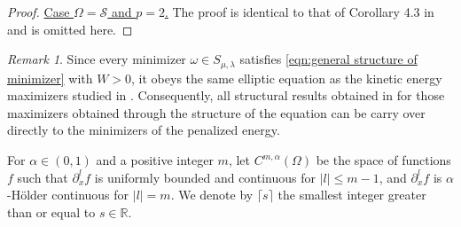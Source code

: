 \documentclass[11pt,letterpaper]{amsart}
\theoremstyle{definition}
\theoremstyle{remark}
\newtheorem{remark}[thm]{Remark}
\renewcommand{\S}{\mathcal{S}}
\renewcommand{\O}{\Omega}
\numberwithin{equation}{section}
\begin{document}
\begin{proof}
    \underline{Case $\Omega=\S$ and $p=2$.} The proof is identical to that of Corollary 4.3 in \cite{Dong2026StabilityOV} and is omitted here.
    
\end{proof}


\begin{remark}
    Since every minimizer $\omega \in S_{\mu,\lambda}$ satisfies \eqref{eqn:general structure of minimizer} with $W>0$, it obeys the same elliptic equation as the kinetic energy maximizers studied in \cite{abe2025existence}. Consequently, all structural results obtained in \cite{abe2025existence} for those maximizers obtained through the structure of the equation can be carry over directly to the minimizers of the penalized energy.
\end{remark}


For $\alpha \in (0, 1)$ and a positive integer $m$, let $C^{m,\alpha}(\O)$ be the space of functions $f$ such that $\partial^l_x f$ is uniformly bounded and continuous for $|l| \le m-1$, and $\partial^l_x f$ is $\alpha$-Hölder continuous for $|l| = m$. We denote by $\lceil s \rceil$ the smallest integer greater than or equal to $s \in \mathbb{R}$.
\end{document}
